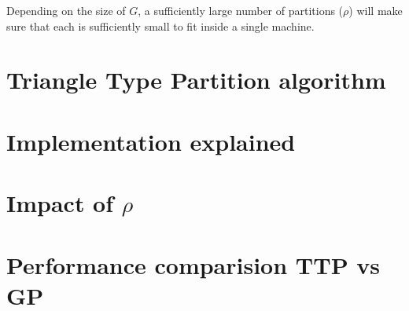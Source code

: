 \documentclass[paper=a4, fontsize=11pt]{scrartcl}
\numberwithin{equation}{section}
\numberwithin{figure}{section}
\numberwithin{table}{section}
\begin{document}
Depending on the size of $G$, a sufficiently large number of partitions ($\rho$)
will make sure that each is sufficiently small to fit inside a single machine.

\section{Triangle Type Partition algorithm}

\section{Implementation explained}

\section{Impact of $\rho$}

\section{Performance comparision TTP vs GP}
\end{document}
